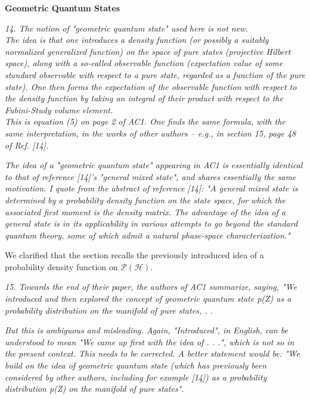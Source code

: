 \documentclass{article}
\newcommand{\REVIEW}[1]{{ \it \textcolor{reviewblack}{#1}}}
\newcommand{\REPLY}[1]{\textcolor{UCDBlue}{#1}}
\begin{document}
{\bf Geometric Quantum States}

\REVIEW{14. The notion of "geometric quantum state" used here is not new.}\\

\REVIEW{The idea is that one introduces a density function (or possibly a suitably normalized generalized function) on the space of pure states (projective Hilbert space), along with a so-called observable function (expectation value of some standard observable with respect to a pure state, regarded as a function of the pure state). One then forms the expectation of the observable function with respect to the density function by taking an integral of their product with respect to the Fubini-Study volume element.}\\

\REVIEW{This is equation (5) on page 2 of AC1. One finds the same formula, with the same interpretation, in the works of other authors – e.g., in section 15, page 48 of Ref. [14].}

\REVIEW{The idea of a "geometric quantum state" appearing in AC1 is essentially identical to that of reference [14]'s "general mixed state", and shares essentially the same motivation. I quote from the abstract of reference [14]: "A general mixed state is determined by a probability density function on the state space, for which the associated first moment is the density matrix. The advantage of the idea of a general state is in its applicability in various attempts to go beyond the standard quantum theory, some of which admit a natural phase-space characterization."}

\REPLY{We clarified that the section recalls the previously introduced idea of a probability density function on $\mathcal{P}(\mathcal{H})$.}

\REVIEW{15. Towards the end of their paper, the authors of AC1 summarize, saying, "We introduced and then explored the concept of geometric quantum state p(Z) as a probability distribution on the manifold of pure states, . . }

\REVIEW{But this is ambiguous and misleading. Again, "Introduced", in English, can be understood to mean "We came up first with the idea of . . .", which is not so in the present context. This needs to be corrected. A better statement would be: "We build on the idea of geometric quantum state (which has previously been considered by other authors, including for example [14]) as a probability distribution p(Z) on the manifold of pure states".}
\end{document}
